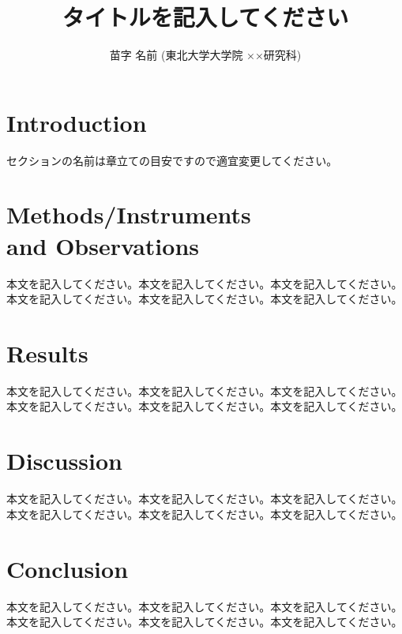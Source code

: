 \documentclass[a4paper,10pt,oneside,twocolumn,notitlepage,final]{jarticle}
\author{苗字 名前 (東北大学大学院 ××研究科)}
\title{タイトルを記入してください}
\begin{document}





\section{Introduction}
セクションの名前は章立ての目安ですので適宜変更してください。



\section{Methods/Instruments \\ and Observations}
本文を記入してください。本文を記入してください。本文を記入してください。本文を記入してください。本文を記入してください。本文を記入してください。


\section{Results}
本文を記入してください。本文を記入してください。本文を記入してください。本文を記入してください。本文を記入してください。本文を記入してください。


\section{Discussion}
本文を記入してください。本文を記入してください。本文を記入してください。本文を記入してください。本文を記入してください。本文を記入してください。


\section{Conclusion}
本文を記入してください。本文を記入してください。本文を記入してください。本文を記入してください。本文を記入してください。本文を記入してください。
\end{document}
